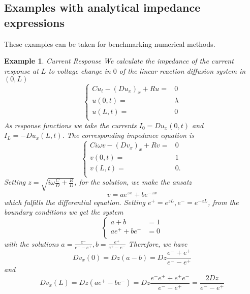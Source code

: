 \documentclass[12pt]{amsproc}
\newtheorem{example}{Example}
\begin{document}
\subsection{Examples with analytical impedance expressions}
These examples can be taken for benchmarking numerical methods.
\begin{example}{Current Response}
  We calculate the impedance of the current response at $L$ to voltage change in $0$ of the linear reaction  diffusion system in $(0,L)$  
  \begin{equation*}
    \begin{cases}
      Cu_t - (Du_x)_x + Ru=&0\\
      u(0,t)=&\lambda\\
      u(L,t)=&0\\
    \end{cases}
  \end{equation*}
    As response functions we take the currents  $I_0=Du_x(0,t)$ and $I_L=-Du_x(L,t)$.
    The corresponding impedance equation is
    \begin{equation*}
      \begin{cases}
        Ci\omega v - (Dv_x)_x +Rv =&0\\
        v(0,t)=&1\\
        v(L,t)=&0.\\
      \end{cases}
    \end{equation*}
Setting $z=\sqrt{i\omega\frac{C}{D}+\frac{R}{D}}$, for the solution, we make the ansatz
\begin{equation*}
  v=ae^{zx}+be^{-zx}
\end{equation*}
which fulfills the differential equation.
Setting $e^+=e^{zL},e^-=e^{-zL}$, from the boundary 
conditions we get the system
\begin{equation*}
  \begin{cases}
    a+b&=1\\
    ae^++be^-&=0\\
  \end{cases}
\end{equation*}
with the solutions $a=\frac{e^-}{e^--e^+},b=\frac{e^+}{e^+-e^-}$
Therefore, we have
\begin{equation*}
  Dv_x(0)=Dz(a-b)=Dz\frac{e^-+e^+}{e^--e^+}
\end{equation*}
and
\begin{equation*}
  Dv_x(L)=Dz(ae^+-be^-)=Dz\frac{e^-e^++e^+e^-}{e^--e^+}=\frac{2Dz}{e^--e^+}
\end{equation*}


\end{example}
\end{document}
